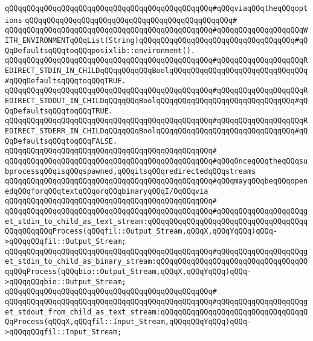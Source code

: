 \verb|qQQqqQQqqQQqqQQqqQQqqQQqqQQqqQQqqQQqqQQqqQQqqQQq#qQQqviaqQQqtheqQQqoptions|\newline
\verb|qQQqqQQqqQQqqQQqqQQqqQQqqQQqqQQqqQQqqQQqqQQqqQQq#|\newline
\verb|qQQqqQQqqQQqqQQqqQQqqQQqqQQqqQQqqQQqqQQqqQQqqQQq#qQQqqQQqqQQqqQQqqQQqWITH_ENVIRONMENTqQQqList(String)qQQqqQQqqQQqqQQqqQQqqQQqqQQqqQQqqQQq#qQQqDefaultsqQQqtoqQQqposixlib::environment().|\newline
\verb|qQQqqQQqqQQqqQQqqQQqqQQqqQQqqQQqqQQqqQQqqQQqqQQq#qQQqqQQqqQQqqQQqqQQqREDIRECT_STDIN_IN_CHILDqQQqqQQqqQQqBoolqQQqqQQqqQQqqQQqqQQqqQQqqQQqqQQq#qQQqDefaultsqQQqtoqQQqTRUE.|\newline
\verb|qQQqqQQqqQQqqQQqqQQqqQQqqQQqqQQqqQQqqQQqqQQqqQQq#qQQqqQQqqQQqqQQqqQQqREDIRECT_STDOUT_IN_CHILDqQQqqQQqBoolqQQqqQQqqQQqqQQqqQQqqQQqqQQqqQQq#qQQqDefaultsqQQqtoqQQqTRUE.|\newline
\verb|qQQqqQQqqQQqqQQqqQQqqQQqqQQqqQQqqQQqqQQqqQQqqQQq#qQQqqQQqqQQqqQQqqQQqREDIRECT_STDERR_IN_CHILDqQQqqQQqBoolqQQqqQQqqQQqqQQqqQQqqQQqqQQqqQQq#qQQqDefaultsqQQqtoqQQqFALSE.|\newline
\verb|qQQqqQQqqQQqqQQqqQQqqQQqqQQqqQQqqQQqqQQqqQQqqQQq#|\newline
\verb|qQQqqQQqqQQqqQQqqQQqqQQqqQQqqQQqqQQqqQQqqQQqqQQq#qQQqOnceqQQqtheqQQqsubprocessqQQqisqQQqspawned,qQQqitsqQQqredirectedqQQqstreams|\newline
\verb|qQQqqQQqqQQqqQQqqQQqqQQqqQQqqQQqqQQqqQQqqQQqqQQq#qQQqmayqQQqbeqQQqopenedqQQqforqQQqtextqQQqorqQQqbinaryqQQqI/OqQQqvia|\newline
\verb|qQQqqQQqqQQqqQQqqQQqqQQqqQQqqQQqqQQqqQQqqQQqqQQq#|\newline
\verb|qQQqqQQqqQQqqQQqqQQqqQQqqQQqqQQqqQQqqQQqqQQqqQQq#qQQqqQQqqQQqqQQqqQQqget_stdin_to_child_as_text_stream:qQQqqQQqqQQqqQQqqQQqqQQqqQQqqQQqqQQqqQQqqQQqqQQqProcess(qQQqfil::Output_Stream,qQQqX,qQQqYqQQq)qQQq->qQQqqQQqfil::Output_Stream;|\newline
\verb|qQQqqQQqqQQqqQQqqQQqqQQqqQQqqQQqqQQqqQQqqQQqqQQq#qQQqqQQqqQQqqQQqqQQqget_stdin_to_child_as_binary_stream:qQQqqQQqqQQqqQQqqQQqqQQqqQQqqQQqqQQqqQQqProcess(qQQqbio::Output_Stream,qQQqX,qQQqYqQQq)qQQq->qQQqqQQqbio::Output_Stream;|\newline
\verb|qQQqqQQqqQQqqQQqqQQqqQQqqQQqqQQqqQQqqQQqqQQqqQQq#|\newline
\verb|qQQqqQQqqQQqqQQqqQQqqQQqqQQqqQQqqQQqqQQqqQQqqQQq#qQQqqQQqqQQqqQQqqQQqget_stdout_from_child_as_text_stream:qQQqqQQqqQQqqQQqqQQqqQQqqQQqqQQqqQQqProcess(qQQqX,qQQqfil::Input_Stream,qQQqqQQqYqQQq)qQQq->qQQqqQQqfil::Input_Stream;|\newline
